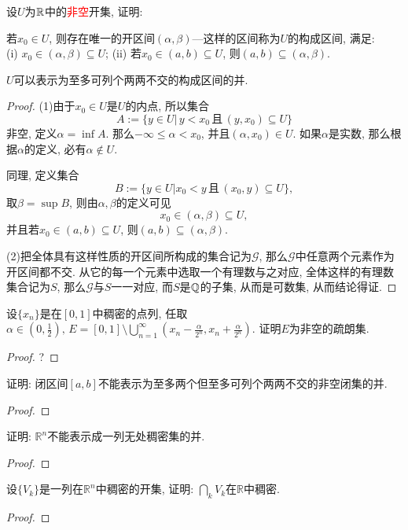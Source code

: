 \begin{quizb}
\begin{solution}
\end{solution}
\woestar 设\(U\)为\(\mathbb{R}\)中的\textcolor{red}{非空}开集, 证明:
\begin{quizcs}
    \item 若\(x_0\in U\), 则存在唯一的开区间\((\alpha,\beta)\)---这样的区间称为\(U\)的构成区间, 满足: \\ (i) \(x_0\in(\alpha,\beta)\subseteq U\); (ii) 若\(x_0\in (a,b)\subseteq U\), 则\((a,b)\subseteq (\alpha,\beta)\).
    \item \(U\)可以表示为至多可列个两两不交的构成区间的并.
\end{quizcs}
\begin{proof}
	(1)由于\(x_0\in U\)是\(U\)的内点, 所以集合\[A:=\{y\in U\big|\,y<x_0\,\text{且}\,(y,x_0)\subseteq U\}\]非空, 定义\(\alpha=\inf A\). 那么\(-\infty\leqslant\alpha<x_0\), 并且\((\alpha,x_0)\in U\). 如果\(\alpha\)是实数, 那么根据\(\alpha\)的定义, 必有\(\alpha\notin U\).
	
	同理, 定义集合\[B:=\{y\in U\big|x_0<y\,\text{且}\,(x_0,y)\subseteq U\},\]取\(\beta=\sup B\), 则由\(\alpha,\beta\)的定义可见\[x_0\in(\alpha,\beta)\subseteq U,\]并且若\(x_0\in(a,b)\subseteq U\), 则\((a,b)\subseteq (\alpha,\beta)\).
	
	(2)把全体具有这样性质的开区间所构成的集合记为\(\mathscr{G}\), 那么\(\mathscr{G}\)中任意两个元素作为开区间都不交. 从它的每一个元素中选取一个有理数与之对应, 全体这样的有理数集合记为\(S\), 那么\(\mathscr{G}\)与\(S\)一一对应, 而\(S\)是\(\mathbb{Q}\)的子集, 从而是可数集, 从而结论得证.
\end{proof}
\woe 设\(\{x_n\}\)是在\([0,1]\)中稠密的点列, 任取\(\alpha\in\left(0,\frac{1}{2}\right),\,E=[0,1]\setminus\bigcup_{n=1}^{\infty}\left(x_n-\frac{\alpha}{2^n},x_n+\frac{\alpha}{2^n}\right)\). 证明\(E\)为非空的疏朗集.
\begin{proof}
	?
\end{proof}
\woe 证明: 闭区间\([a,b]\)不能表示为至多两个但至多可列个两两不交的非空闭集的并.
\begin{proof}
	
\end{proof}
\woe 证明: \(\mathbb{R}^n\)不能表示成一列无处稠密集的并.
\begin{proof}
	
\end{proof}
\woe 设\(\{V_k\}\)是一列在\(\mathbb{R}^n\)中稠密的开集, 证明: \(\bigcap_{k}V_k\)在\(\mathbb{R}\)中稠密.
\begin{proof}
	
\end{proof}
\end{quizb}
